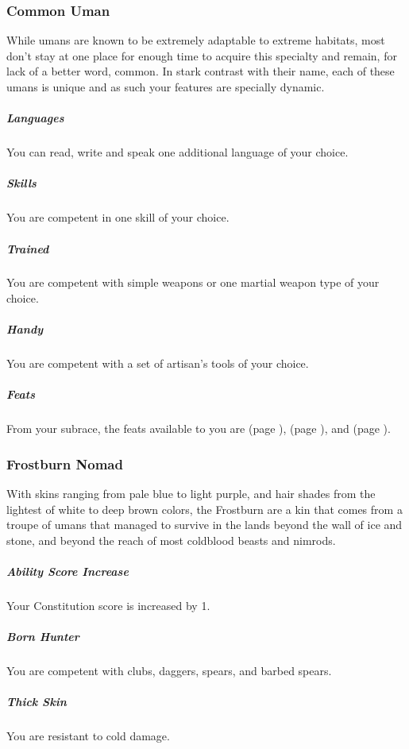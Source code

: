 \subsubsection{Common Uman}
    While umans are known to be extremely adaptable to extreme habitats, most don't stay at one place for enough time to acquire this specialty and remain, for lack of a better word, common.
    In stark contrast with their name, each of these umans is unique and as such your features are specially dynamic.

    \subparagraph{Languages} You can read, write and speak one additional language of your choice.

    \subparagraph{Skills} You are competent in one skill of your choice.

    \subparagraph{Trained} You are competent with simple weapons or one martial weapon type of your choice.

    \subparagraph{Handy} You are competent with a set of artisan's tools of your choice.


    \subparagraph{Feats} From your subrace, the feats available to you are
    \textbf{} (page \pageref{feat::}),
    \textbf{} (page \pageref{feat::}), and
    \textbf{} (page \pageref{feat::}).

\subsubsection{Frostburn Nomad}
    With skins ranging from pale blue to light purple, and hair shades from the lightest of white to deep brown colors, the Frostburn are a kin that comes from a troupe of umans that managed to survive in the lands beyond the wall of ice and stone, and beyond the reach of most coldblood beasts and nimrods.

    \subparagraph{Ability Score Increase} Your Constitution score is increased by 1.


    \subparagraph{Born Hunter} You are competent with clubs, daggers, spears, and barbed spears.

    \subparagraph{Thick Skin} %
    You are resistant to cold damage.%

